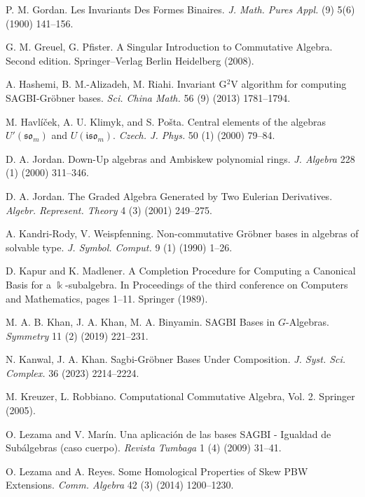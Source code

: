 \documentclass{amsart}
\theoremstyle{definition}
\theoremstyle{remark}
\numberwithin{equation}{section}
\begin{document}
\begin{thebibliography}{}
 P. M. Gordan. Les Invariants Des Formes Binaires. {\em J. Math. Pures Appl.} (9) 5(6) (1900) 141--156.

 G. M. Greuel, G. Pfister. A Singular Introduction to Commutative Algebra. Second edition. Springer--Verlag Berlin Heidelberg (2008).

 A. Hashemi, B. M.-Alizadeh, M. Riahi. Invariant G$^2$V algorithm for computing {S}{A}{G}{B}{I}-{G}r\"obner bases. {\em Sci. China Math.} 56 (9) (2013) 1781--1794.

 M. Havl\'i\v{c}ek, A. U. Klimyk, and S. Po\v{s}ta. Central elements of the algebras ${U}'(\mathfrak{so}_m)$ and ${U}(\mathfrak{iso}_m)$. {\em Czech. J. Phys.} 50 (1) (2000) 79--84.

 D. A. Jordan. Down-Up algebras and Ambiskew polynomial rings. {\em J. Algebra} 228 (1) (2000) 311--346.

 D. A. Jordan. The Graded Algebra Generated by Two Eulerian Derivatives. {\em Algebr. Represent. Theory} 4 (3) (2001) 249--275.

 A. Kandri-Rody, V. Weispfenning. Non-commutative Gr\"obner bases in algebras of solvable type. {\em J. Symbol. Comput.}  9 (1) (1990) 1--26.

 D. Kapur and K. Madlener. A Completion Procedure for Computing a Canonical Basis for a $\Bbbk$-subalgebra. In Proceedings of the third conference on Computers and Mathematics, pages 1--11. Springer (1989). 

 M. A. B. Khan, J. A. Khan, M. A. Binyamin. SAGBI Bases in $G$-Algebras. {\em Symmetry} 11 (2) (2019) 221--231.

 N. Kanwal, J. A. Khan. Sagbi-{G}r\"obner {B}ases {U}nder {C}omposition. {\em J. Syst. Sci. Complex.} 36 (2023) 2214--2224.

 M. Kreuzer, L. Robbiano. Computational Commutative Algebra, Vol. 2. Springer (2005).

 O. Lezama and V. Mar\'in. Una aplicaci\'on de las bases SAGBI - Igualdad de Sub\'algebras (caso cuerpo). {\em Revista Tumbaga} 1 (4) (2009) 31--41.

 O. Lezama and A. Reyes. Some {H}omological {P}roperties of {S}kew {P}{B}{W} {E}xtensions. {\em Comm. Algebra} 42 (3) (2014) 1200--1230.


\end{thebibliography}
\end{document}

